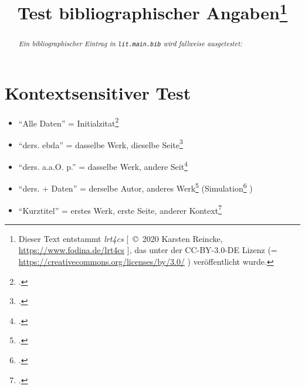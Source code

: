 \documentclass[
  DIV=calc,
  BCOR=5mm,
  11pt,
  headings=small,
  oneside,
  abstract=true,
  toc=bib,
  english,ngerman]{scrartcl}
\begin{document}
\nocite{*}

\titlehead{Bib\LaTeX}
\subject{Release 1.0}
\title{Test bibliographischer Angaben\footnote{Dieser Text entstammt \emph{lrt4cs} [\ \copyright\ 2020 Karsten Reincke, \href{https://www.fodina.de/lrt4cs}{https://www.fodina.de/lrt4cs} ], das unter der CC-BY-3.0-DE Lizenz (= \href{https://creativecommons.org/licenses/by/3.0/}{https://creativecommons.org/licenses/by/3.0/} ) veröffentlicht wurde.}}

\maketitle
\begin{abstract}
\noindent \itshape
Ein bibliographischer Eintrag in \texttt{lit.main.bib} wird fallweise ausgetestet:
\end{abstract}



\section{Kontextsensitiver Test}

\begin{itemize}
  \item \enquote{Alle Daten} = Initialzitat\footcite[vgl.][123]{KantKdrV1974}
  \item \enquote{ders. ebda} = dasselbe Werk, dieselbe Seite\footcite[vgl.][123]{KantKdrV1974}
  \item \enquote{ders. a.a.O. p.} = dasselbe Werk, andere Seit\footcite[vgl.][125f]{KantKdrV1974}
  \item \enquote{ders. + Daten} = derselbe Autor, anderes Werk\footcite[vgl.][321]{KantKdpV1974} (Simulation\footcite[vgl.][42]{KantKdU1974} )
  \item \enquote{Kurztitel} = erstes Werk, erste Seite, anderer  Kontext\footcite[vgl.][123]{KantKdrV1974}
\end{itemize}



\printnomenclature
\printbibliography
\end{document}
